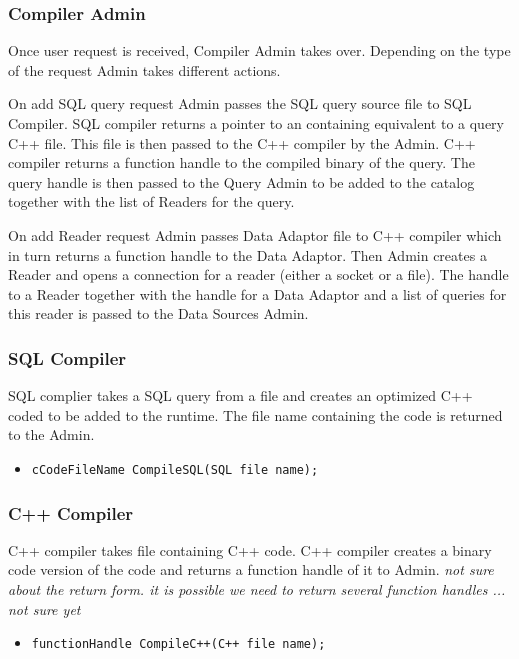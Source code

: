 \documentclass[11pt]{article}
\begin{document}
\subsubsection{Compiler Admin}

Once user request is received, Compiler Admin takes over. Depending on the type of the request Admin takes different actions. 

On add SQL query request Admin passes the SQL query source file to SQL Compiler. SQL compiler returns a pointer to an containing equivalent to a query C++ file. This file is then passed to the C++ compiler by the Admin. C++ compiler returns a function handle to the compiled binary of the query. The query handle is then passed to the Query Admin to be added to the catalog together with the list of Readers for the query.

On add Reader request Admin passes Data Adaptor file to C++ compiler which in turn returns a function handle to the Data Adaptor. Then Admin creates a Reader and opens a connection for a reader (either a socket or a file). The handle to a Reader together with the handle for a Data Adaptor and a list of queries for this reader is passed to the Data Sources Admin. 

\subsubsection{SQL Compiler}

SQL complier takes a SQL query from a file and creates an optimized C++ coded to be added to the runtime. The file name containing the code is returned to the Admin.

\begin{itemize}
	\item {\tt cCodeFileName CompileSQL(SQL file name);}
\end{itemize}

\subsubsection{C++ Compiler}

C++ compiler takes file containing C++ code. C++ compiler creates a binary code version of the code and returns a function handle of it to Admin. \emph{not sure about the return form. it is possible we need to return several function handles ... not sure yet}

\begin{itemize}
	\item {\tt functionHandle CompileC++(C++ file name);}
\end{itemize}
\end{document}
